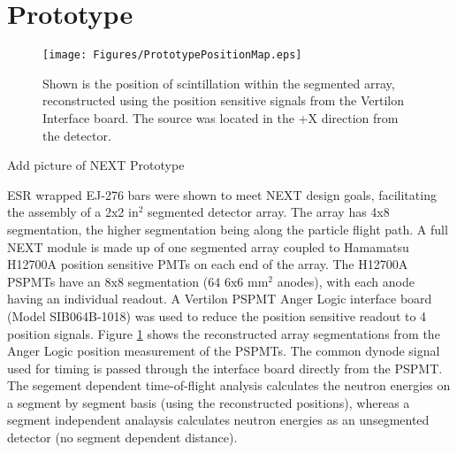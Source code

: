 \begin{comment}%
\subsubsection{SiPM}
\begin{figure}[htbp]
  \centering
  \texttt{[image: Figures/SiPM\_PSD.png]}
  \caption{Single SiPM PSD response from ESR wrapped EJ-276 bar. The gamma flux was attenuated with a 2 inch lead shielding. The figure of merit was calculated to be 0.90 for QDC values greater that 200k and 1.2 for QDC values [600k,800k] (REPLOT WITH ENERGIES).}
  \label{fig:SiPMPSD}
\end{figure}
SiPMs have a characteristically long decay length without any pre-amplificication. The effect of such a long decay on neutron-gamma discrimination was measured with the ESR-wrapped EJ-276 bar with a single SiPM detector on each end. The signals were digitized and analyzed with the CCM to determine the effect of light detection against detector type. Figure \ref{fig:SiPMPSD} shows the SiPM capabilities to EJ-276 neutron and gamma-ray scintillation.
\end{comment}%

\section{Prototype} \label{Prototype}
\begin{figure}[htbp]
  \centering
  \texttt{[image: Figures/PrototypePositionMap.eps]}
  \caption{Shown is the position of scintillation within the segmented array, reconstructed using the position sensitive signals from the Vertilon Interface board. The source was located in the +X direction from the detector.}
  \label{fig:PSPMTImage}
\end{figure}

\begin{center}
  Add picture of NEXT Prototype
\end{center}

ESR wrapped EJ-276 bars were shown to meet NEXT design goals, facilitating the assembly of a 2x2 in$^{2}$ segmented detector array. The array has 4x8 segmentation, the higher segmentation being along the particle flight path. A full NEXT module is made up of one segmented array coupled to Hamamatsu H12700A position sensitive PMTs on each end of the array. The H12700A PSPMTs have an 8x8 segmentation (64 6x6 mm$^{2}$ anodes), with each anode having an individual readout. A Vertilon PSPMT Anger Logic interface board (Model SIB064B-1018) was used to reduce the position sensitive readout to 4 position signals. Figure \ref{fig:PSPMTImage} shows the reconstructed array segmentations from the Anger Logic position measurement of the PSPMTs. The common dynode signal used for timing is passed through the interface board directly from the PSPMT. The segement dependent time-of-flight analysis calculates the neutron energies on a segment by segment basis (using the reconstructed positions), whereas a segment independent analaysis calculates neutron energies as an unsegmented detector (no segment dependent distance).

